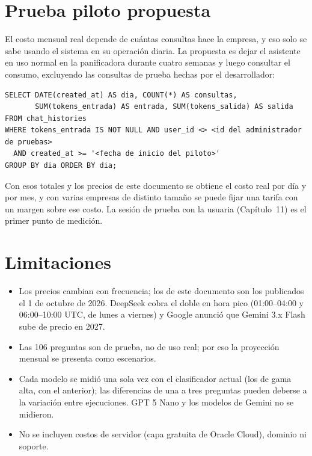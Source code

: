 \documentclass[letterpaper,11pt]{article}
\begin{document}
\section{Prueba piloto propuesta}\label{sec:piloto}

El costo mensual real depende de cuántas consultas hace la empresa, y eso solo se sabe usando el sistema en su operación diaria. La propuesta es dejar el asistente en uso normal en la panificadora durante cuatro semanas y luego consultar el consumo, excluyendo las consultas de prueba hechas por el desarrollador:

\begin{verbatim}
SELECT DATE(created_at) AS dia, COUNT(*) AS consultas,
       SUM(tokens_entrada) AS entrada, SUM(tokens_salida) AS salida
FROM chat_histories
WHERE tokens_entrada IS NOT NULL AND user_id <> <id del administrador de pruebas>
  AND created_at >= '<fecha de inicio del piloto>'
GROUP BY dia ORDER BY dia;
\end{verbatim}

Con esos totales y los precios de este documento se obtiene el costo real por día y por mes, y con varias empresas de distinto tamaño se puede fijar una tarifa con un margen sobre ese costo. La sesión de prueba con la usuaria (Capítulo~11) es el primer punto de medición.

\section{Limitaciones}

\begin{itemize}[nosep]
\item Los precios cambian con frecuencia; los de este documento son los publicados el 1 de octubre de 2026. DeepSeek cobra el doble en hora pico (01:00–04:00 y 06:00–10:00 UTC, de lunes a viernes) y Google anunció que Gemini 3.x Flash sube de precio en 2027.
\item Las 106 preguntas son de prueba, no de uso real; por eso la proyección mensual se presenta como escenarios.
\item Cada modelo se midió una sola vez con el clasificador actual (los de gama alta, con el anterior); las diferencias de una a tres preguntas pueden deberse a la variación entre ejecuciones. GPT 5 Nano y los modelos de Gemini no se midieron.
\item No se incluyen costos de servidor (capa gratuita de Oracle Cloud), dominio ni soporte.
\end{itemize}
\end{document}
